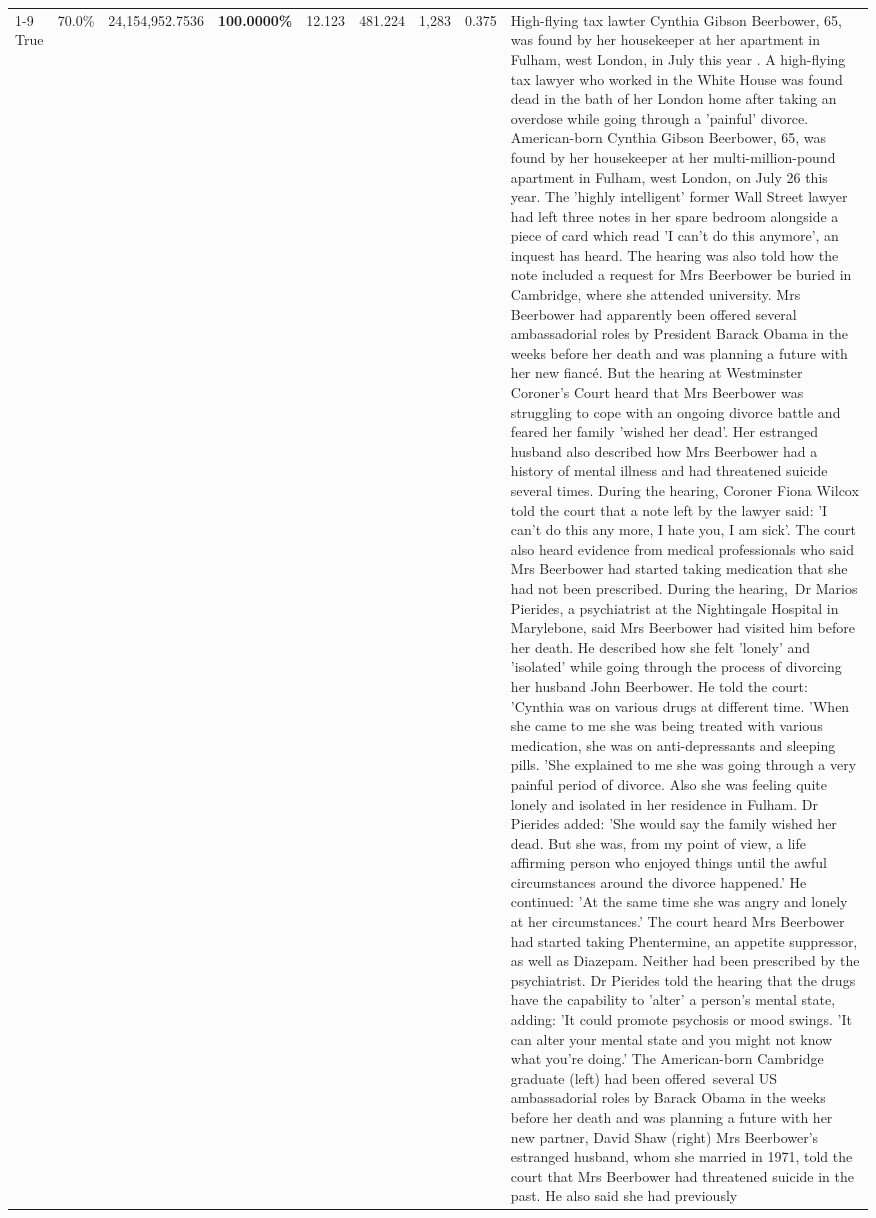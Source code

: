 \begin{table}[H]
\begin{tabular}{lllrlllll}
\cline{1-9}
True & 70.0\% & 24,154,952.7536 & \bfseries \color{red} 100.0000\% & 12.123 & 481.224 & 1,283 & 0.375 & High-flying tax lawter Cynthia Gibson Beerbower, 65, was found by her housekeeper at her apartment in Fulham, west London, in July this year . A high-flying tax lawyer who worked in the White House was found dead in the bath of her London home after taking an overdose while going through a 'painful' divorce. American-born Cynthia Gibson Beerbower, 65, was found by her housekeeper at her multi-million-pound apartment in Fulham, west London, on July 26 this year. The 'highly intelligent' former Wall Street lawyer had left three notes in her spare bedroom alongside a piece of card which read 'I can't do this anymore', an inquest has heard. The hearing was also told how the note included a request for Mrs Beerbower be buried in Cambridge, where she attended university. Mrs Beerbower had apparently been offered several ambassadorial roles by President Barack Obama in the weeks before her death and was planning a future with her new fiancé. But the hearing at Westminster Coroner's Court heard that Mrs Beerbower was struggling to cope with an ongoing divorce battle and feared her family 'wished her dead'. Her estranged husband also described how Mrs Beerbower had a history of mental illness and had threatened suicide several times. During the hearing, Coroner Fiona Wilcox told the court that a note left by the lawyer said: 'I can't do this any more, I hate you, I am sick'. The court also heard evidence from medical professionals who said Mrs Beerbower had started taking medication that she had not been prescribed. During the hearing, Dr Marios Pierides, a psychiatrist at the Nightingale Hospital in Marylebone, said Mrs Beerbower had visited him before her death. He described how she felt 'lonely' and 'isolated' while going through the process of divorcing her husband John Beerbower. He told the court: 'Cynthia was on various drugs at different time. 'When she came to me she was being treated with various medication, she was on anti-depressants and sleeping pills. 'She explained to me she was going through a very painful period of divorce. Also she was feeling quite lonely and isolated in her residence in Fulham. Dr Pierides added: 'She would say the family wished her dead. But she was, from my point of view, a life affirming person who enjoyed things until the awful circumstances around the divorce happened.' He continued: 'At the same time she was angry and lonely at her circumstances.' The court heard Mrs Beerbower had started taking Phentermine, an appetite suppressor, as well as Diazepam. Neither had been prescribed by the psychiatrist. Dr Pierides told the hearing that the drugs have the capability to 'alter' a person's mental state, adding: 'It could promote psychosis or mood swings. 'It can alter your mental state and you might not know what you're doing.' The American-born Cambridge graduate (left) had been offered several US ambassadorial roles by Barack Obama in the weeks before her death and was planning a future with her new partner, David Shaw (right) Mrs Beerbower's estranged husband, whom she married in 1971, told the court that Mrs Beerbower had threatened suicide in the past. He also said she had previously 
\end{tabular}
\end{table}
